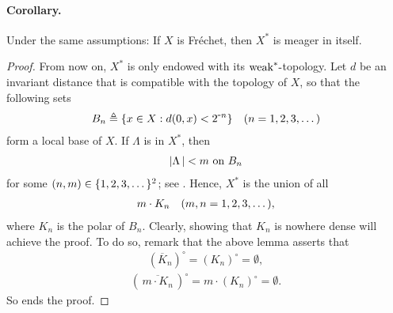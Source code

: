 \paragraph{Corollary.}%
Under the same assumptions: If $X$ is Fréchet, %
then $X^\ast$ is meager in itself.
%
\begin{proof}%
From now on, $X^\ast$ is only endowed with its $\text{weak}^\ast\text{-}$topology. %
Let $d$ be an invariant distance that is compatible with the topology of $X$, %
so that the following sets
%
  \begin{align}
    B_n \triangleq \{x\in X: d(0, x) <  2^{\text{\small{-}} n}\}\quad (n=1, 2, 3, \dots) 
  \end{align}
%
form a local base of $X$. %
%
If $\Lambda$ is in $X^\ast$, then %
%
  \begin{align}
    \left\lvert \Lambda \,\right\rvert <  m \text{ on } B_n
  \end{align}
%
for some $(n, m) \in \{1, 2, 3, \dots\}^2$; see . %
%
Hence, $X^\ast$ is the union of all %
%
  \begin{align}\label{3.11. Countable union.}
    m\cdot K_n \quad (m,n=1, 2, 3, \dots), 
  \end{align}
%
where $K_n$ is the polar of $B_n$. %
Clearly, showing that $K_n$ is nowhere dense will achieve the proof. %
To do so, remark that the above lemma asserts that %
%
  \begin{align}
    \left({\overline{K}_n}\right)^\circ = \left({{K}_n}\right)^\circ =\emptyset, 
  \end{align}
%
\ie %
%
  \begin{align}\label{3.11. Nowhere dense.}
    \left(\,{\overline{m\cdot K_n}}\, \right)^\circ 
      = 
    m\cdot \left({{K}_n}\right)^\circ 
      = 
    \emptyset.
  \end{align}
%
So ends the proof.%
\end{proof}